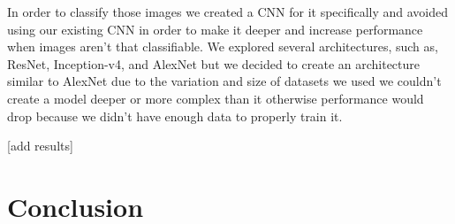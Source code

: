 \documentclass{turabian-thesis}
\begin{document}
In order to classify those images we created a CNN for it specifically and avoided using our existing CNN in order to make it deeper and increase performance when images aren’t that classifiable. We explored several architectures, such as, ResNet, Inception-v4, and AlexNet but we decided to create an architecture similar to AlexNet due to the variation and size of datasets we used we couldn’t create a model deeper or more complex than it otherwise performance would drop because we didn’t have enough data to properly train it.



[add results]






\chapter{Conclusion}
\label{chap:conclusion}


% 
%  
\end{document}
